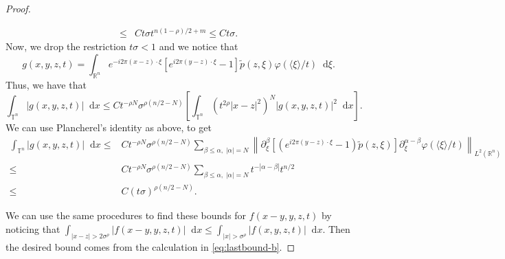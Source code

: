 \documentclass[10pt,a4paper]{amsart}
\newcommand*\diff{\mathop{}\!\mathrm{d}}
\begin{document}
\begin{proof}
\begin{itemize}
\begin{align*}
            \leq& Ct\sigma t^{n(1-\rho)/2 + m} \leq Ct\sigma.
        \end{align*}
        Now, we drop the restriction $t\sigma<1$ and we notice that
        \begin{equation*}
            g(x, y, z, t) = \int_{\mathbb{R}^n} e^{-i2\pi (x-z) \cdot \xi} \left[ e^{i2\pi (y-z) \cdot \xi} -1 \right]\tilde{p}(z, \xi)\varphi(\langle\xi\rangle/t) \diff \xi.
        \end{equation*}
        Thus, we have that
        \begin{equation*}
            \int_{\mathbb{T}^n} |g(x, y, z, t)|\diff x \leq Ct^{-\rho N}\sigma^{\rho(n/2 - N)} \left[ \int_{\mathbb{T}^n} (t^{2\rho}|x-z|^2)^N|g(x, y, z, t)|^2\diff x \right].
        \end{equation*}
        We can use Plancherel's identity as above, to get
        \begin{align*}
            \int_{\mathbb{T}^n} |g(x, y, z, t)|\diff x \leq & Ct^{-\rho N}\sigma^{\rho(n/2 - N)} \sum_{\beta\leq\alpha,\;|\alpha|=N} \left\| \partial^\beta_\xi \left[ (e^{i2\pi (y-z) \cdot \xi} -1)\tilde{p}(z, \xi) \right] \partial^{\alpha-\beta}_\xi\varphi(\langle\xi\rangle/t) \right\|_{L^2(\mathbb{R}^n)} \\
            \leq& Ct^{-\rho N}\sigma^{\rho(n/2 - N)} \sum_{\beta\leq\alpha,\;|\alpha|=N}t^{-|\alpha-\beta|}t^{n/2} \\
            \leq & C(t\sigma)^{\rho(n/2-N)}.
        \end{align*}
    \end{itemize}
    We can use the same procedures to find these bounds for $f(x-y, y,z, t)$ by noticing that $\int_{|x-z|>2\sigma^\rho} |f(x-y, y,z, t)|\diff x \leq \int_{|x|>\sigma^\rho} |f(x, y,z, t)|\diff x$. Then the desired bound comes from the calculation in \cref{eq:lastbound-b}.
\end{proof}
\end{document}
